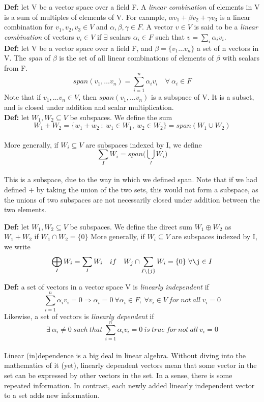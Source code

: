 \documentclass[12pt]{article}
\begin{document}
\textbf{Def: }let V be a vector space over a field F. A \emph{linear combination} of elements in V is a sum of multiples of elements of V. For example, $\alpha v_1 + \beta v_2 + \gamma v_3$ is a linear combination for $v_1,v_2,v_3 \in V$ and $\alpha, \beta, \gamma \in F$. A vector $v \in V$ is said to be a \emph{linear combination} of vectors $v_i \in V$ if $\exists$ scalars $\alpha_i \in F$ such that $v = \sum_{i}^{}\alpha_i v_i$.\\

\textbf{Def: }let V be a vector space over a field F, and $\beta =  \{ v_1 \dots v_n  \}$ a set of n vectors in V. The \emph{span} of $\beta$ is the set of all linear combinations of elements of $\beta$ with scalars from F.
$$span(v_1,\dots v_n) = \sum_{i = 1}^{n}\alpha_i v_i \quad \forall\ \alpha_i \in F$$
Note that if $v_1,\dots v_n \in V$, then $span(v_1,\dots v_n)$ is a subspace of V. It is a subset, and is closed under addition and scalar multiplication.\\

\textbf{Def: }let $W_1, W_2 \subseteq V$ be subspaces. We define the sum $$W_1 + W_2 = \{ w_1 + w_2\ :\ w_1 \in W_1,\ w_2 \in W_2 \} = span(W_1 \cup W_2)$$\\
More generally, if $W_i \subseteq V$ are subspaces indexed by I, we define$$\sum_{I}W_i = span\Bigg(\bigcup_{I}W_i \Bigg)$$\\
This is a subspace, due to the way in which we defined span. Note that if we had defined $+$ by taking the union of the two sets, this would not form a subspace, as the unions of two subspaces are not necessarily closed under addition between the two elements.

\textbf{Def: }let $W_1, W_2 \subseteq V$ be subspaces. We define the direct sum $W_1 \oplus W_2$ as $W_1 + W_2$ if $W_1 \cap W_2 = \{ 0 \}$
More generally, if $W_i \subseteq V$ are subspaces indexed by I, we write$$\bigoplus_{I}W_i = \sum_{I}W_i \quad if \quad W_j \cap \sum_{I \setminus \{ j \}}W_i = \{ 0 \}\ \forall\j \in I$$

\textbf{Def: }a set of vectors in a vector space V is \emph{linearly independent} if $$\sum_{i = 1}^{n}\alpha_i v_i = 0 \Rightarrow \alpha_i = 0\ \forall \alpha_i \in F,\ \forall v_i \in V\ for\ not\ all\ v_i = 0$$
Likewise, a set of vectors is \emph{linearly dependent} if $$\exists\ \alpha_i \neq 0\ such\ that\ \sum_{i = 1}^{n}\alpha_i v_i = 0\ is\ true\ for\ not\ all\ v_i = 0$$\\
Linear (in)dependence is a big deal in linear algebra. Without diving into the mathematics of it (yet), linearly dependent vectors mean that some vector in the set can be expressed by other vectors in the set. In a sense, there is some repeated information. In contrast, each newly added linearly independent vector to a set adds new information.\\
\end{document}
